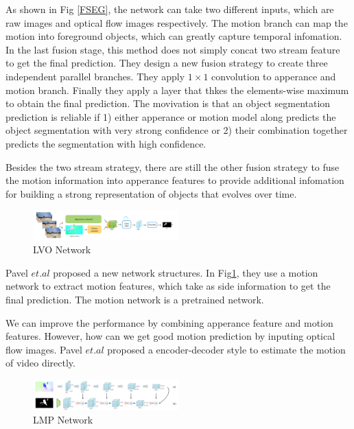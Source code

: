As shown in Fig \ref{FSEG}, the network can take two different inputs, which are raw images and optical flow images respectively.
The motion branch can map the motion into foreground objects, which can greatly capture temporal infomation.
In the last fusion stage, this method does not simply concat two stream feature to get the final prediction.
They design a new fusion strategy to create three independent parallel branches. They apply $1\times1$ convolution to apperance and
motion branch. Finally they apply a layer that thkes the elements-wise maximum to obtain the final prediction. The movivation is that 
an object segmentation prediction is reliable if 1) either apperance or motion model along predicts the object 
segmentation with very strong confidence or 2) their combination together predicts the segmentation with high confidence. 

Besides the two stream strategy, there are still the other fusion strategy to fuse the motion information into apperance 
features to provide additional infomation for building a strong representation of objects that evolves over time. 

\begin{figure}[ht]
    \centering
    \includegraphics[width=0.5\textwidth]{./figure/LVO_NET.png}
    \caption{LVO Network}
    \label{LVO}
\end{figure}

Pavel $et.al$\cite{Tokmakov2017Learning} proposed a new network structures. In Fig\ref{LVO}, they use a motion network to extract motion features, which 
take as side information to get the final prediction. The motion network is a pretrained network.

We can improve the performance by combining apperance feature and motion features. However, how can we get good motion
prediction by inputing optical flow images. Pavel $et.al$\cite{LMPV} proposed a encoder-decoder style to estimate the motion 
of video directly.

\begin{figure}[ht]
    \centering
    \includegraphics[width=0.5\textwidth]{./figure/LMP_NET.png}
    \caption{LMP Network}
    \label{LMP}
\end{figure}

